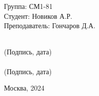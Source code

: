 \vspace{3cm}
\begin{flushright}
    \begin{minipage}{0.6\linewidth}
        \begin{flushleft}
            Группа: СМ1-81
            \\
            Студент: Новиков А.Р.
            \\
            \vspace{3ex}
            Преподаватель: Гончаров Д.А.
        \end{flushleft}
    \end{minipage}
    \begin{minipage}{0.3\linewidth}
        \begin{center}
            \vspace{9ex}
            \underline{\hspace{5cm}} 
            \\
            \footnotesize (Подпись, дата)
            \\[10pt]
            \underline{\hspace{5cm}} 
            \\
            \footnotesize (Подпись, дата)
        \end{center}
    \end{minipage}
\end{flushright}
\begin{table}[b]
    \center Москва, 2024
\end{table}
\thispagestyle{empty}
